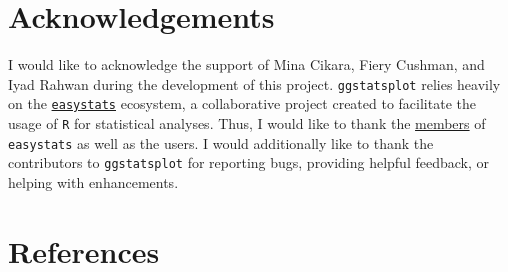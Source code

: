 \documentclass[
]{article}
\begin{document}
\hypertarget{acknowledgements}{%
\section{Acknowledgements}\label{acknowledgements}}

I would like to acknowledge the support of Mina Cikara, Fiery Cushman,
and Iyad Rahwan during the development of this project.
\texttt{ggstatsplot} relies heavily on the
\href{https://github.com/easystats/easystats}{\texttt{easystats}}
ecosystem, a collaborative project created to facilitate the usage of
\texttt{R} for statistical analyses. Thus, I would like to thank the
\href{https://github.com/orgs/easystats/people}{members} of
\texttt{easystats} as well as the users. I would additionally like to
thank the contributors to \texttt{ggstatsplot} for reporting bugs,
providing helpful feedback, or helping with enhancements.

\hypertarget{references}{%
\section*{References}\label{references}}
\end{document}
